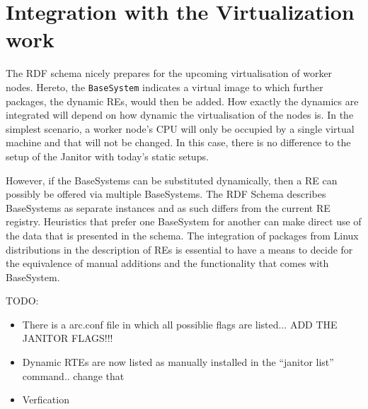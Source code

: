 \section{Integration with the Virtualization work}

The RDF schema nicely prepares for the upcoming virtualisation of worker
nodes. Hereto, the {\tt BaseSystem} indicates a virtual image to which
further packages, the dynamic REs, would then be added.
How exactly the dynamics are integrated will depend on how
dynamic the virtualisation of the nodes is. In the simplest scenario,
a worker node's CPU will only be occupied by a single virtual machine
and that will not be changed. In this case, there is no difference to
the setup of the Janitor with today's static setups.

However, if the BaseSystems can be substituted dynamically, then a RE
can possibly be offered via multiple BaseSystems. The RDF
Schema describes BaseSystems as separate instances and as such differs
from the current RE registry.  Heuristics that prefer one BaseSystem for
another can make direct use of the data that is presented in the schema.
The integration of packages from Linux distributions in the description
of REs is essential to have a means to decide for the equivalence of
manual additions and the functionality that comes with BaseSystem.


TODO:\\
\begin{itemize}
 \item There is a arc.conf file in which all possiblie flags are listed... ADD THE JANITOR FLAGS!!!
 \item Dynamic RTEs are now listed as manually installed in the ``janitor list'' command.. change that
 \item Verfication
\end{itemize}

